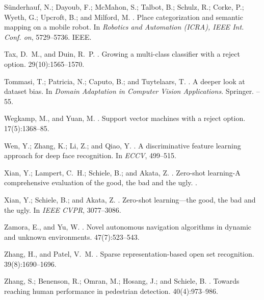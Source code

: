\documentclass[letterpaper]{article}
\begin{document}
\begin{thebibliography}{}
Sünderhauf, N.; Dayoub, F.; McMahon, S.; Talbot, B.; Schulz, R.; Corke, P.;
  Wyeth, G.; Upcroft, B.; and Milford, M.
.
\newblock Place categorization and semantic mapping on a mobile robot.
\newblock In {\em Robotics and {Automation} ({ICRA}), {IEEE} {Int.} {Conf.}
  on},  5729--5736.
\newblock IEEE.

Tax, D.~M., and Duin, R.~P.
.
\newblock Growing a multi-class classifier with a reject option.
 29(10):1565--1570.

Tommasi, T.; Patricia, N.; Caputo, B.; and Tuytelaars, T.
.
\newblock A deeper look at dataset bias.
\newblock In {\em Domain Adaptation in Computer Vision Applications}. Springer.
--55.

Wegkamp, M., and Yuan, M.
.
\newblock Support vector machines with a reject option.
 17(5):1368--85.

Wen, Y.; Zhang, K.; Li, Z.; and Qiao, Y.
.
\newblock A discriminative feature learning approach for deep face recognition.
\newblock In {\em ECCV},  499--515.

Xian, Y.; Lampert, C.~H.; Schiele, B.; and Akata, Z.
.
\newblock Zero-shot learning-{A} comprehensive evaluation of the good, the bad
  and the ugly.
.

Xian, Y.; Schiele, B.; and Akata, Z.
.
\newblock Zero-shot learning—the good, the bad and the ugly.
\newblock In {\em IEEE CVPR},  3077--3086.

Zamora, E., and Yu, W.
.
\newblock Novel autonomous navigation algorithms in dynamic and unknown
  environments.
 47(7):523--543.

Zhang, H., and Patel, V.~M.
.
\newblock Sparse representation-based open set recognition.
  39(8):1690--1696.

Zhang, S.; Benenson, R.; Omran, M.; Hosang, J.; and Schiele, B.
.
\newblock Towards reaching human performance in pedestrian detection.
 40(4):973--986.

\end{thebibliography}
\end{document}

